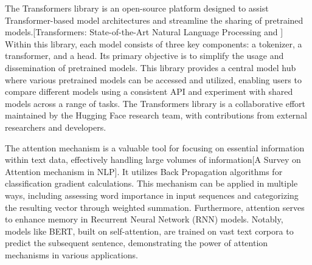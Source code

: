\documentclass[conference]{IEEEtran}
\begin{document}
The Transformers library is an open-source platform designed to assist Transformer-based model architectures and streamline the sharing of pretrained models.[Transformers: State-of-the-Art Natural Language Processing and ] Within this library, each model consists of three key components: a tokenizer, a transformer, and a head. Its primary objective is to simplify the usage and dissemination of pretrained models. This library provides a central model hub where various pretrained models can be accessed and utilized, enabling users to compare different models using a consistent API and experiment with shared models across a range of tasks. The Transformers library is a collaborative effort maintained by the Hugging Face research team, with contributions from external researchers and developers. 

The attention mechanism is a valuable tool for focusing on essential information within text data, effectively handling large volumes of information[A Survey on Attention mechanism in NLP]. It utilizes Back Propagation algorithms for classification gradient calculations. This mechanism can be applied in multiple ways, including assessing word importance in input sequences and categorizing the resulting vector through weighted summation. Furthermore, attention serves to enhance memory in Recurrent Neural Network (RNN) models. Notably, models like BERT, built on self-attention, are trained on vast text corpora to predict the subsequent sentence, demonstrating the power of attention mechanisms in various applications.
\end{document}

